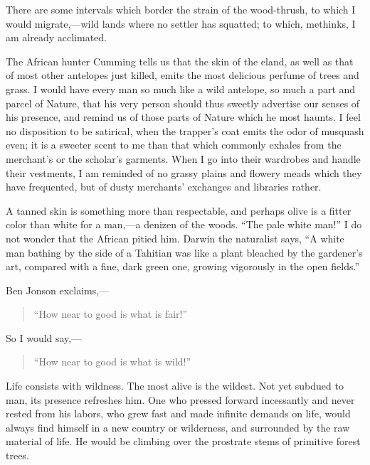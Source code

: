\documentclass[twoside,openright,10pt]{memoir} %
\begin{document}
There are some intervals which border the strain of the wood-thrush, to which I would migrate,—wild lands where no settler has squatted; to which, methinks, I am already acclimated.

The African hunter Cumming tells us that the skin of the eland, as well as that of most other antelopes just killed, emits the most delicious perfume of trees and grass. I would have every man so much like a wild antelope, so much a part and parcel of Nature, that his very person should thus sweetly advertise our senses of his presence, and remind us of those parts of Nature which he most haunts. I feel no disposition to be satirical, when the trapper’s coat emits the odor of musquash even; it is a sweeter scent to me than that which commonly exhales from the merchant’s or the scholar’s garments. When I go into their wardrobes and handle their vestments, I am reminded of no grassy plains and flowery meads which they have frequented, but of dusty merchants’ exchanges and libraries rather.

A tanned skin is something more than respectable, and perhaps olive is a fitter color than white for a man,—a denizen of the woods. “The pale white man!” I do not wonder that the African pitied him. Darwin the naturalist says, “A white man bathing by the side of a Tahitian was like a plant bleached by the gardener’s art, compared with a fine, dark green one, growing vigorously in the open fields.”

Ben Jonson exclaims,— 
\begin{quotation} 
  “How near to good is what is fair!”
\end{quotation}

So I would say,—
\begin{quotation}
“How near to good is what is wild!”
\end{quotation}
Life consists with wildness. The most alive is the wildest. Not yet subdued to man, its presence refreshes him. One who pressed forward incessantly and never rested from his labors, who grew fast and made infinite demands on life, would always find himself in a new country or wilderness, and surrounded by the raw material of life. He would be climbing over the prostrate stems of primitive forest trees.
\end{document}
